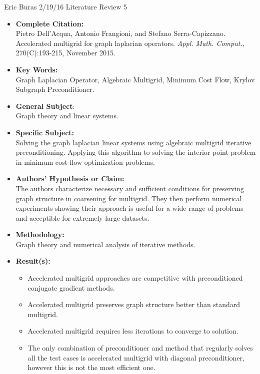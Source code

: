 \documentclass{article}
\begin{document}
Eric Buras 2/19/16 Literature Review 5
\\
\begin{itemize}
\setlength\itemsep{1em}
\item{\textbf{Complete Citation:}}
\\
Pietro Dell'Acqua, Antonio Frangioni, and Stefano Serra-Capizzano. Accelerated multigrid for graph laplacian operators. \textit{Appl. Math. Comput.}, 270(C):193-215, November 2015.

\item{\textbf{Key Words:}} 
\\
Graph Laplacian Operator, Algebraic Multigrid, Minimum Cost Flow, Krylov Subgraph Preconditioner.

\item{\textbf{General Subject}:}
\\
Graph theory and linear systems.

\item{\textbf{Specific Subject:}}
\\
Solving the graph laplacian linear systems using algebraic multigrid iterative preconditioning. Applying this algorithm to solving the interior point problem in minimum cost flow optimization problems.

\item{\textbf{Authors' Hypothesis or Claim:}}
\\
The authors characterize necessary and sufficient conditions for preserving graph structure in coarsening for multigrid. They then perform numerical experiments showing their approach is useful for a wide range of problems and acceptible for extremely large datasets.

\item{\textbf{Methodology:}}
\\
Graph theory and numerical analysis of iterative methods. 

\item{\textbf{Result(s):}}
\\
\begin{itemize}
\item
Accelerated multigrid approaches are competitive with preconditioned conjugate gradient methods.
\item
Accelerated multigrid preserves graph structure better than standard multigrid.
\item
Accelerated multigrid requires less iterations to converge to solution.
\item
The only combination of preconditioner and method that regularly solves all the test cases is accelerated multigrid with diagonal preconditioner, however this is not the most efficient one.


\end{itemize}
\end{itemize}
\end{document}
